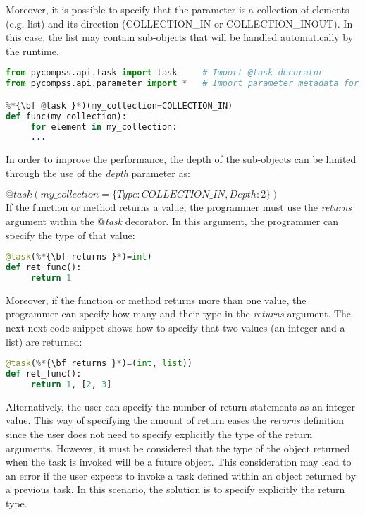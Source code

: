 Moreover, it is possible to specify that the parameter is a collection of elements (e.g. list) and its
direction (COLLECTION\_IN or COLLECTION\_INOUT). 
In this case, the list may contain sub-objects that will be handled automatically by the runtime.

\begin{lstlisting}[language=python]
from pycompss.api.task import task     # Import @task decorator
from pycompss.api.parameter import *   # Import parameter metadata for the @task decorator

%*{\bf @task }*)(my_collection=COLLECTION_IN)
def func(my_collection):
     for element in my_collection:
     ...
\end{lstlisting}

In order to improve the performance, the depth of the sub-objects can be limited through the use of the
{\it depth} parameter as:

$@task(my\_collection=\{Type: COLLECTION\_IN, Depth: 2\})$ \\

If the function or method returns a value, the programmer must use the {\it returns}  argument within
the {\it $@$task} decorator. In this argument, the programmer can specify the type of that value:

\begin{lstlisting}[language=python]
@task(%*{\bf returns }*)=int)
def ret_func():
     return 1
\end{lstlisting}

Moreover, if the function or method returns more than one value, the programmer can specify how many 
and their type in the {\it returns} argument. The next next code snippet shows how to specify that two 
values (an integer and a list) are returned:

\begin{lstlisting}[language=python]
@task(%*{\bf returns }*)=(int, list))
def ret_func():
     return 1, [2, 3]
\end{lstlisting}

Alternatively, the user can specify the number of return statements as an integer value. This way of
specifying the amount of return eases the {\it returns} definition since the user does not need to
specify explicitly the type of the return arguments. However, it must be considered that the type 
of the object returned when the task is invoked will be a future object.
This consideration may lead to an error if the user expects to invoke a task defined within an object
returned by a previous task. In this scenario, the solution is to specify explicitly the return type.


